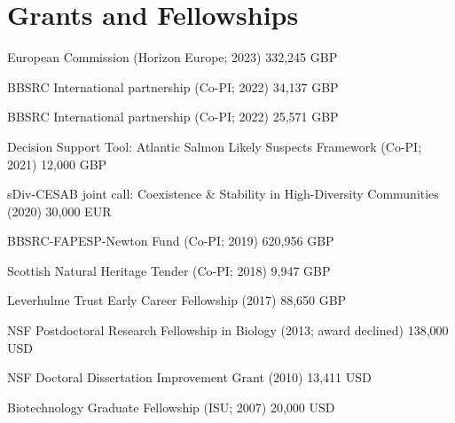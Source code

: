 \documentclass[letterpaper]{article}
\renewenvironment{itemize}{
  \begin{list}{}{
    \setlength{\leftmargin}{1.5em}
  }
}{
  \end{list}
}
\begin{document}
\section*{Grants and Fellowships}
\begin{itemize}
\item European Commission (Horizon Europe; 2023) \hfill 332,245 GBP
\item BBSRC International partnership (Co-PI; 2022) \hfill 34,137 GBP
\item BBSRC International partnership (Co-PI; 2022) \hfill 25,571 GBP
\item Decision Support Tool: Atlantic Salmon Likely Suspects Framework (Co-PI; 2021) \hfill 12,000 GBP
\item sDiv-CESAB joint call: Coexistence \& Stability in High-Diversity Communities (2020) \hfill 30,000 EUR
\item BBSRC-FAPESP-Newton Fund (Co-PI; 2019) \hfill 620,956 GBP
\item Scottish Natural Heritage Tender (Co-PI; 2018) \hfill 9,947 GBP
\item Leverhulme Trust Early Career Fellowship (2017) \hfill 88,650 GBP
\item NSF Postdoctoral Research Fellowship in Biology (2013; award declined) \hfill 138,000 USD
\item NSF Doctoral Dissertation Improvement Grant (2010) \hfill 13,411 USD
\item Biotechnology Graduate Fellowship (ISU; 2007) \hfill 20,000 USD 
\end{itemize}
\end{document}
